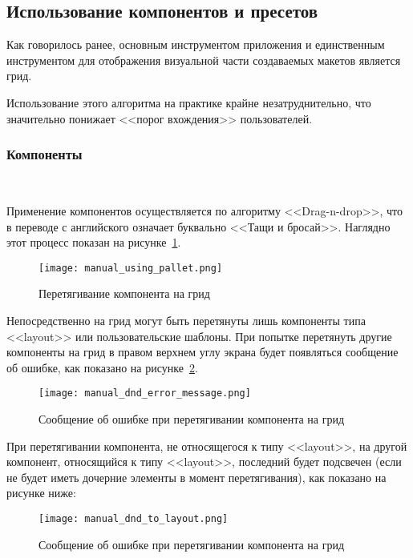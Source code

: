 \subsection{Использование компонентов и пресетов}
\label{sec:manual:components_manual}

Как говорилось ранее, основным инструментом приложения и единственным инструментом для отображения визуальной части создаваемых макетов является грид.

Использование этого алгоритма на практике крайне незатруднительно, что значительно понижает <<порог вхождения>> пользователей.

\subsubsection{Компоненты}
\

Применение компонентов осуществляется по алгоритму <<Drag-n-drop>>, что в переводе с английского означает буквально <<Тащи и бросай>>. Наглядно этот процесс показан на рисунке~\ref{sec:manual:manual_using_pallet}.

\begin{figure}[ht]
	\centering
    \texttt{[image: manual\_using\_pallet.png]}
    \caption{Перетягивание компонента на грид}
    \label{sec:manual:manual_using_pallet}
\end{figure}

Непосредственно на грид могут быть перетянуты лишь компоненты типа <<layout>> или пользовательские шаблоны. При попытке перетянуть другие компоненты на грид в правом верхнем углу экрана будет появляться сообщение об ошибке, как показано на рисунке~\ref{sec:manual:manual_dnd_error_message}.

\begin{figure}[ht]
	\centering
    \texttt{[image: manual\_dnd\_error\_message.png]}
    \caption{Сообщение об ошибке при перетягивании компонента на грид}
    \label{sec:manual:manual_dnd_error_message}
\end{figure}

При перетягивании компонента, не относящегося к типу <<layout>>, на другой компонент, относящийся к типу <<layout>>, последний будет подсвечен (если не будет иметь дочерние элементы в момент перетягивания), как показано на рисунке ниже:

\begin{figure}[ht]
	\centering
    \texttt{[image: manual\_dnd\_to\_layout.png]}
    \caption{Сообщение об ошибке при перетягивании компонента на грид}
    \label{sec:manual:manual_dnd_to_layout}
\end{figure}

